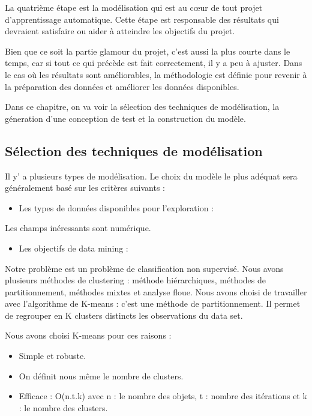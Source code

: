 \documentclass{article}
\begin{document}
            La quatrième étape est la modélisation qui est au cœur de tout projet d'apprentissage automatique. Cette étape est responsable des résultats qui devraient satisfaire ou aider à atteindre les objectifs du projet.
            \par Bien que ce soit la partie glamour du projet, c'est aussi la plus courte dans le temps, car si tout ce qui précède est fait correctement, il y a peu à ajuster. Dans le cas où les résultats sont améliorables, la méthodologie est définie pour revenir à la préparation des données et améliorer les données disponibles.
            \par Dans ce chapitre, on va voir la sélection des techniques de modélisation, la géneration d’une conception de test et la construction du modèle.
            \subsection{Sélection des techniques de modélisation}
            Il y’ a plusieurs types de modélisation. Le choix du modèle le plus adéquat sera généralement basé sur les critères suivants :
            \begin{itemize}
                \item Les types de données disponibles pour l’exploration :
            \end{itemize}

                \newline Les champs inéressants sont numérique.
            \begin{itemize}
                \item Les objectifs de data mining :
            \end{itemize}
                \par Notre problème est un problème  de classification  non supervisé. Nous avons plusieurs méthodes de clustering : méthode hiérarchiques, méthodes de partitionnement, méthodes mixtes et analyse floue. 
                \newline Nous avons choisi de travailler avec l’algorithme de K-means : c’est une méthode de partitionnement. Il permet de regrouper en K clusters distincts les observations du data set.
                \par Nous avons choisi K-means pour ces raisons :
            \begin{itemize}
                \item Simple et robuste.
                \item On définit nous même le nombre de clusters.
                \item Efficace : O(n.t.k) avec n : le nombre des objets, t : nombre des itérations et k : le nombre des clusters.
            \end{itemize}
\end{document}
